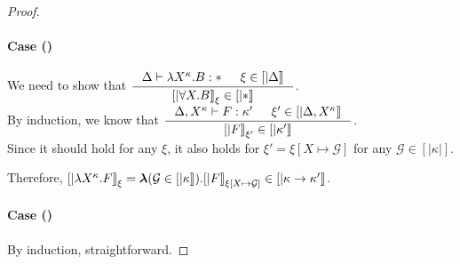 \begin{proof}
\paragraph{Case ()}
We need to show that
$ \inference{\Delta |- \l X^\kappa.B:* & \xi\in[|\Delta|]}
        {[|\forall X.B|]_\xi\in[|*|]} $.
\vspace*{.3em} \\
By induction, we know that 
$ \inference{\Delta,X^\kappa |- F:\kappa' & \xi'\in[|\Delta,X^\kappa|]}
        {[|F|]_{\xi'} \in [|\kappa'|]} $.
\vspace*{.3em} \\
Since it should hold for any $\xi$, it also holds for
$\xi'=\xi[X\mapsto\mathcal{G}]$ for any $\mathcal{G}\in[|\kappa|]$.

Therefore,
$  [|\lambda X^\kappa.F|]_\xi
 = \boldsymbol\lambda(\mathcal{G}\in[|\kappa|]).[|F|]_{\xi[X\mapsto\mathcal{G}]}
        \in [|\kappa -> \kappa'|]$.

\paragraph{Case ()} By induction, straightforward.
\end{proof}


